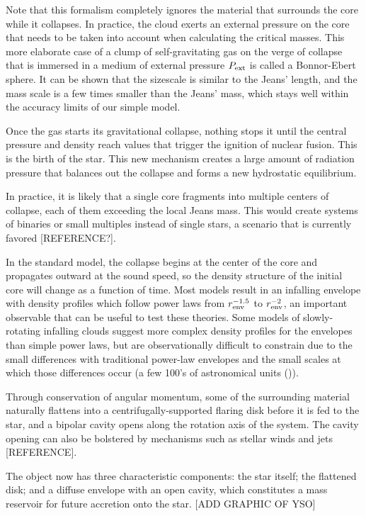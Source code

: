 Note that this formalism completely ignores the material that surrounds the core while it collapses. In practice, the cloud exerts an external pressure on the core that needs to be taken into account when calculating the critical masses. This more elaborate case of a clump of self-gravitating gas on the verge of collapse that is immersed in a medium of external pressure $P_\textrm{ext}$ is called a Bonnor-Ebert sphere. It can be shown \citep{McKee:2007bd} that the sizescale is similar to the Jeans' length, and the mass scale is a few times smaller than the Jeans' mass, which stays well within the accuracy limits of our simple model.

Once the gas starts its gravitational collapse, nothing stops it until the central pressure and density reach values that trigger the ignition of nuclear fusion. This is the birth of the star. This new mechanism creates a large amount of radiation pressure that balances out the collapse and forms a new hydrostatic equilibrium. 

In practice, it is likely that a single core fragments into multiple centers of collapse, each of them exceeding the local Jeans mass. This would create systems of binaries or small multiples instead of single stars, a scenario that is currently favored [REFERENCE?].

In the standard model, the collapse begins at the center of the core and propagates outward at the sound speed, so the density structure of the initial core will change as a function of time. Most models result in an infalling envelope with density profiles which follow power laws from $r_\textrm{env}^{-1.5}$ to $r_\textrm{env}^{-2}$, an important observable that can be useful to test these theories. Some models of slowly-rotating infalling clouds suggest more complex density profiles for the envelopes \citep[e.g.][]{Ulrich:1976ho,Terebey:1984hi} than simple power laws, but are observationally difficult to constrain due to the small differences with traditional power-law envelopes and the small scales at which those differences occur (a few 100's of astronomical units (\si{\au})).

Through conservation of angular momentum, some of the surrounding material naturally flattens into a centrifugally-supported flaring disk before it is fed to the star, and a bipolar cavity opens along the rotation axis of the system. The cavity opening can also be bolstered by mechanisms such as stellar winds and jets [REFERENCE].

The object now has three characteristic components: the star itself; the flattened disk; and a diffuse envelope with an open cavity, which constitutes a mass reservoir for future accretion onto the star. [ADD GRAPHIC OF YSO]

